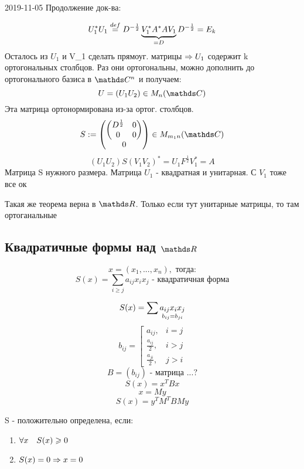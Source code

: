 \documentclass[main]{subfiles}
\begin{document}
  \begin{lect}{2019-11-05}
    Продолжение док-ва:
    \begin{Proof}
      \[U_1^* U_1 \os{def}{=} D^{-\frac{1}{2}} \ub{=D}{V_1^* A^* A V_1} D^{-\frac{1}{2}} = E_k\]
      Осталось из $U_1$ и V_1 сделать прямоуг. матрицы $\Ra U_1$ содержит k ортогональных столбцов. Раз они ортогональны, можно дополнить до ортогонального базиса в $\CC^n$ и получаем:
      \[U=(U_1 U_2) \in M_n(\CC)\]
      Эта матрица ортонормирована из-за ортог. столбцов.
      \[S:=\begin{pmatrix}
      \begin{pmatrix}
        D^{\frac{1}{2}} & 0\\
        0 & 0
      \end{pmatrix}\\
      0
      \end{pmatrix} \in M_{m_1 n}(\CC)\]
      \[(U_1 U_2) S (V_1 V_2)^* = U_1 F^{\frac{1}{2}} V_1^* = A\]
      Матрица S нужного размера. Матрица $U_1$ - квадратная и унитарная. С $V_1$ тоже все ок
    \end{Proof}

    \begin{remark}
      Такая же теорема верна в $\R$. Только если тут унитарные матрицы, то там ортоганальные
    \end{remark}

    \subsection{Квадратичные формы над $\R$}
    \begin{Definition}
      \[x=(x_1,...,x_n),\text{ тогда:}\]
      \[S(x) = \sum_{i \geq j} a_{ij} x_i x_j \text{ - квадратичная форма}\]
    \end{Definition}

    \begin{Remark}
      \[S(x) = \sum \us{b_{ij} = b_{ji}}{a_{ij} x_i x_j}\]
      \[b_{ij} = \left[\begin{matrix}
        a_{ij}, & i=j\\
        \frac{a_{ij}}{2}, & i > j\\
        \frac{a_{ji}}{2}, & j>i
      \end{matrix}\right.\]
      \[B=(b_{ij}) \text{ - матрица ...?}\]
      \[S(x) = x^T B x\]
      \[x = My\]
      \[S(x) = y^T M^T B My\]
    \end{Remark}

    \begin{definition}
      S - положительно определена, если:
      \begin{enumerate}
        \item $\forall x \q S(x) \geq 0$
        \item $S(x) = 0 \Ra x = 0$
      \end{enumerate}
    \end{definition}


\end{lect}
\end{document}
